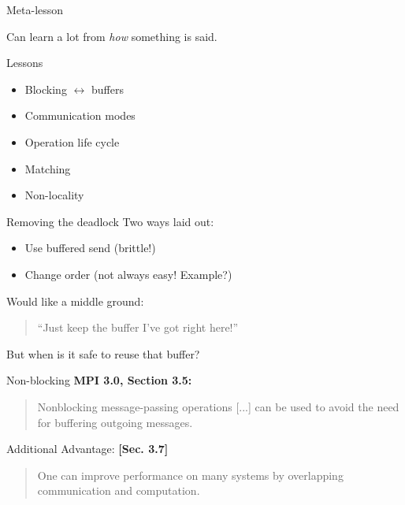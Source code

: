 \documentclass[english,compress]{beamer}
\begin{document}
\begin{frame}{Meta-lesson}
  \begin{center}
    \Large
    Can learn a lot from \emph{how} something is said.
  \end{center}
\end{frame}
\begin{frame}{Lessons}
  \begin{itemize}
    \item Blocking $\leftrightarrow$ buffers
    \item Communication modes
    \item Operation life cycle
    \item Matching
    \item Non-locality
  \end{itemize}
\end{frame}
\begin{frame}{Removing the deadlock}
  Two ways laid out:
  \pause
  \begin{itemize}
    \item Use buffered send (brittle!)
    \item Change order (not always easy! Example?)
  \end{itemize}
  \pause
  \bigskip
  Would like a middle ground: 
  \begin{quote}
  ``Just keep the buffer I've got right here!''
  \end{quote}
  But when is it safe to reuse that buffer?
\end{frame}
\begin{frame}{Non-blocking}
  \textbf{MPI 3.0, Section 3.5:}
  \begin{quote}
    \upshape
    Nonblocking message-passing operations [...] can be used to avoid
    the need for buffering outgoing messages.
  \end{quote}
  Additional Advantage: \textbf{[Sec. 3.7]}
  \begin{quote}
    \upshape
    One can improve performance on many systems by overlapping
    communication and computation.
  \end{quote}
  \uncover<+>{}
\end{frame}
\end{document}
